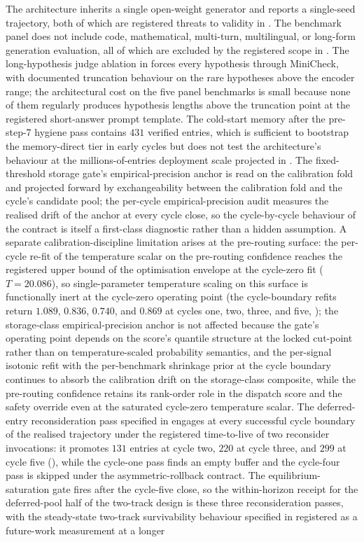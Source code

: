 The architecture inherits a single open-weight generator and reports a single-seed trajectory, both of which are registered threats to validity in . The benchmark panel does not include code, mathematical, multi-turn, multilingual, or long-form generation evaluation, all of which are excluded by the registered scope in . The long-hypothesis judge ablation in  forces every hypothesis through MiniCheck, with documented truncation behaviour on the rare hypotheses above the encoder range; the architectural cost on the five panel benchmarks is small because none of them regularly produces hypothesis lengths above the truncation point at the registered short-answer prompt template. The cold-start memory after the pre-step-7 hygiene pass contains $431$ verified entries, which is sufficient to bootstrap the memory-direct tier in early cycles but does not test the architecture's behaviour at the millions-of-entries deployment scale projected in . The fixed-threshold storage gate's empirical-precision anchor is read on the calibration fold and projected forward by exchangeability between the calibration fold and the cycle's candidate pool; the per-cycle empirical-precision audit measures the realised drift of the anchor at every cycle close, so the cycle-by-cycle behaviour of the contract is itself a first-class diagnostic rather than a hidden assumption. A separate calibration-discipline limitation arises at the pre-routing surface: the per-cycle re-fit of the temperature scalar on the pre-routing confidence reaches the registered upper bound of the optimisation envelope at the cycle-zero fit ($T = 20.086$), so single-parameter temperature scaling on this surface is functionally inert at the cycle-zero operating point (the cycle-boundary refits return $1.089$, $0.836$, $0.740$, and $0.869$ at cycles one, two, three, and five, ); the storage-class empirical-precision anchor is not affected because the gate's operating point depends on the score's quantile structure at the locked cut-point rather than on temperature-scaled probability semantics, and the per-signal isotonic refit with the per-benchmark shrinkage prior at the cycle boundary continues to absorb the calibration drift on the storage-class composite, while the pre-routing confidence retains its rank-order role in the dispatch score and the safety override even at the saturated cycle-zero temperature scalar. The deferred-entry reconsideration pass specified in  engages at every successful cycle boundary of the realised trajectory under the registered time-to-live of two reconsider invocations: it promotes $131$ entries at cycle two, $220$ at cycle three, and $299$ at cycle five (), while the cycle-one pass finds an empty buffer and the cycle-four pass is skipped under the asymmetric-rollback contract. The equilibrium-saturation gate fires after the cycle-five close, so the within-horizon receipt for the deferred-pool half of the two-track design is these three reconsideration passes, with the steady-state two-track survivability behaviour specified in  registered as a future-work measurement at a longer 